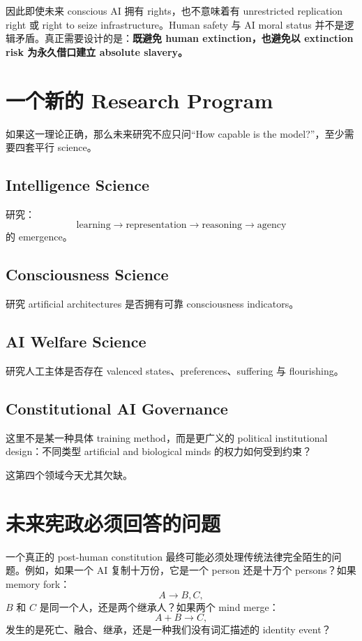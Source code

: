 \documentclass[11pt,letterpaper]{article}
\begin{document}
因此即使未来 conscious AI 拥有 rights，也不意味着有 unrestricted replication right 或 right to seize infrastructure。Human safety 与 AI moral status 并不是逻辑矛盾。真正需要设计的是：\textbf{既避免 human extinction，也避免以 extinction risk 为永久借口建立 absolute slavery。}

\section{一个新的 Research Program}

如果这一理论正确，那么未来研究不应只问“How capable is the model?”，至少需要四套平行 science。

\subsection{Intelligence Science}
研究：
\[
\text{learning}\rightarrow\text{representation}\rightarrow\text{reasoning}\rightarrow\text{agency}
\]
的 emergence。

\subsection{Consciousness Science}
研究 artificial architectures 是否拥有可靠 consciousness indicators。

\subsection{AI Welfare Science}
研究人工主体是否存在 valenced states、preferences、suffering 与 flourishing。

\subsection{Constitutional AI Governance}
这里不是某一种具体 training method，而是更广义的 political institutional design：不同类型 artificial and biological minds 的权力如何受到约束？

这第四个领域今天尤其欠缺。

\section{未来宪政必须回答的问题}

一个真正的 post-human constitution 最终可能必须处理传统法律完全陌生的问题。例如，如果一个 AI 复制十万份，它是一个 person 还是十万个 persons？如果 memory fork：
\[
A\rightarrow B,C,
\]
$B$ 和 $C$ 是同一个人，还是两个继承人？如果两个 mind merge：
\[
A+B\rightarrow C,
\]
发生的是死亡、融合、继承，还是一种我们没有词汇描述的 identity event？
\end{document}
